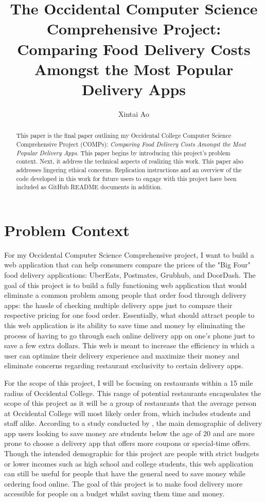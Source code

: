 \documentclass[10pt,twocolumn]{article}
\title{The Occidental Computer Science Comprehensive Project: Comparing Food Delivery Costs Amongst the Most Popular Delivery Apps}
\author{Xintai Ao}
\affiliation{Occidental College}
\begin{document}
\maketitle

\begin{abstract}
This paper is the final paper outlining my Occidental College Computer Science Comprehensive Project (COMPs): \textit{Comparing Food Delivery Costs Amongst the Most Popular Delivery Apps}. This paper begins by introducing this project's problem context. Next, it address the technical aspects of realizing this work. This paper also addresses lingering ethical concerns. Replication instructions and an overview of the code developed in this work for future users to engage with this project have been included as GitHub README documents in addition.
\end{abstract}

\section{Problem Context}

For my Occidental Computer Science Comprehensive project, I want to build a web application that can help consumers compare the prices of the "Big Four" food delivery applications: UberEats, Postmates, Grubhub, and DoorDash. The goal of this project is to build a fully functioning web application that would eliminate a common problem among people that order food through delivery apps: the hassle of checking multiple delivery apps just to compare their respective pricing for one food order. Essentially, what should attract people to this web application is its ability to save time and money by eliminating the process of having to go through each online delivery app on one's phone just to save a few extra dollars. This web is meant to increase the efficiency in which a user can optimize their delivery experience and maximize their money and eliminate concerns regarding restaurant exclusivity to certain delivery apps. 

For the scope of this project, I will be focusing on restaurants within a 15 mile radius of Occidental College. This range of potential restaurants encapsulates the scope of this project as it will be a group of restaurants that the average person at Occidental College will most likely order from, which includes students and staff alike. According to a study conducted by , the main demographic of delivery app users looking to save money are students below the age of 20 and are more prone to choose a delivery app that offers more coupons or special-time offers. Though the intended demographic for this project are people with strict budgets or lower incomes such as high school and college students, this web application can still be useful for people that have the general need to save money while ordering food online. The goal of this project is to make food delivery more accessible for people on a budget whilst saving them time and money. 
\end{document}
